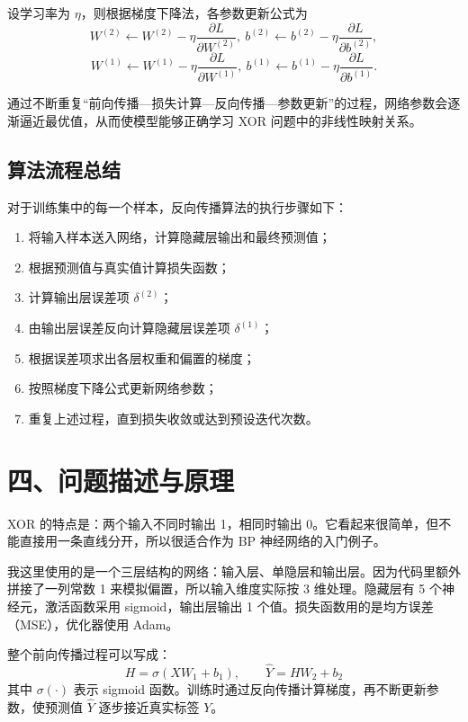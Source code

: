 \documentclass[12pt,a4paper]{ctexart}
\begin{document}
	设学习率为 $\eta$，则根据梯度下降法，各参数更新公式为
	\[
	W^{(2)} \leftarrow W^{(2)} - \eta \frac{\partial L}{\partial W^{(2)}},\ b^{(2)} \leftarrow b^{(2)} - \eta \frac{\partial L}{\partial b^{(2)}},
	\]
	\[
	W^{(1)} \leftarrow W^{(1)} - \eta \frac{\partial L}{\partial W^{(1)}},\ b^{(1)} \leftarrow b^{(1)} - \eta \frac{\partial L}{\partial b^{(1)}}.
	\]
	
	通过不断重复“前向传播—损失计算—反向传播—参数更新”的过程，网络参数会逐渐逼近最优值，从而使模型能够正确学习 XOR 问题中的非线性映射关系。
	
	\subsection{算法流程总结}
	
	对于训练集中的每一个样本，反向传播算法的执行步骤如下：
	
	\begin{enumerate}
		\item 将输入样本送入网络，计算隐藏层输出和最终预测值；
		\item 根据预测值与真实值计算损失函数；
		\item 计算输出层误差项 $\delta^{(2)}$；
		\item 由输出层误差反向计算隐藏层误差项 $\delta^{(1)}$；
		\item 根据误差项求出各层权重和偏置的梯度；
		\item 按照梯度下降公式更新网络参数；
		\item 重复上述过程，直到损失收敛或达到预设迭代次数。
	\end{enumerate}
	
	
	\section*{四、问题描述与原理}
	XOR 的特点是：两个输入不同时输出 1，相同时输出 0。它看起来很简单，但不能直接用一条直线分开，所以很适合作为 BP 神经网络的入门例子。
	
	我这里使用的是一个三层结构的网络：输入层、单隐层和输出层。因为代码里额外拼接了一列常数 1 来模拟偏置，所以输入维度实际按 3 维处理。隐藏层有 5 个神经元，激活函数采用 sigmoid，输出层输出 1 个值。损失函数用的是均方误差（MSE），优化器使用 Adam。
	
	整个前向传播过程可以写成：
	\[
	H = \sigma(XW_1 + b_1), \qquad \hat{Y} = HW_2 + b_2
	\]
	其中 $\sigma(\cdot)$ 表示 sigmoid 函数。训练时通过反向传播计算梯度，再不断更新参数，使预测值 $\hat{Y}$ 逐步接近真实标签 $Y$。
	
\end{document}
